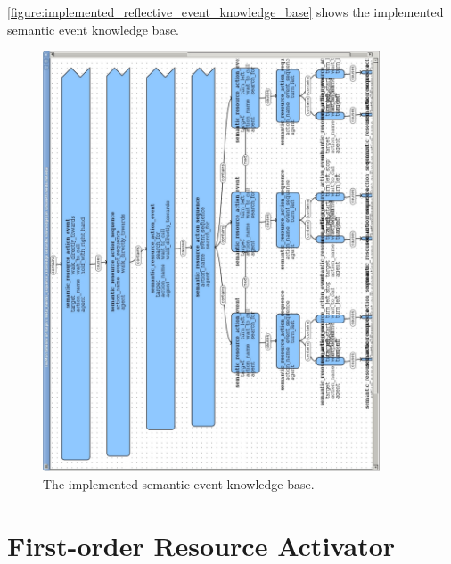 {\mbox{\autoref{figure:implemented_reflective_event_knowledge_base}}}
shows the implemented semantic event knowledge base.
\begin{figure}
\includegraphics[width=10cm]{gfx/implemented_reflective_event_knowledge_base}
\caption[The implemented semantic event knowledge base.]{The
  implemented semantic event knowledge base.}
\label{figure:implemented_reflective_event_knowledge_base}
\end{figure}




\section{First-order Resource Activator}

